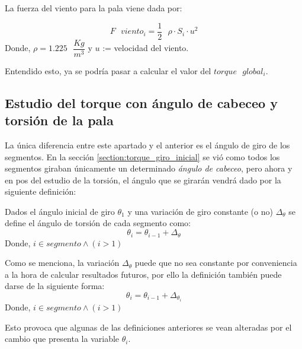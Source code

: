  
 \begin{definicion}
 La fuerza del viento para la pala viene dada por:
 
 $$ F \text{ } viento_i = \dfrac{1}{2} \text{ } \rho \cdot S_i \cdot u^2$$
Donde,
 \centering  $\rho = 1.225 \text{ } \dfrac{Kg}{m^3}$ y $u$ := velocidad del viento.
 \label{def:fuerza_viento_inicial}
 \end{definicion}
 
\vspace{15pt} Entendido esto, ya se podría pasar a calcular el valor del $torque \text{ } global_i$.
 
 
 
 
 
 
 
 
 
 
 
 
 \subsection{Estudio del torque con ángulo de cabeceo y torsión de la pala}
\label{section:torque_giro_torsion}

La única diferencia entre este apartado y el anterior es el ángulo de giro de los segmentos. En la sección \ref{section:torque_giro_inicial} se vió como todos los segmentos giraban únicamente un determinado \textit{ángulo de cabeceo}, pero ahora y en pos del estudio de la torsión, el ángulo que se girarán vendrá dado por la siguiente definición: 


\begin{definicion}
Dados el ángulo inicial de giro $\theta_1 $ y una variación de giro constante (o no) $\Delta_\theta$ se define el ángulo de torsión de cada segmento como:
$$\theta_i = \theta_{i-1} + \Delta_\theta$$ 
Donde,
\centering $i \in segmento \wedge (i > 1)$

\label{def:theta_cte}
\end{definicion}


\begin{definicion}
Como se menciona, la variación $\Delta_\theta$ puede que no sea constante por conveniencia a la hora de calcular resultados futuros, por ello la definición también puede darse de la siguiente forma:
$$\theta_i = \theta_{i-1} + \Delta_{\theta_{i}}$$ 
Donde,
\centering $i \in segmento \wedge (i > 1)$
\label{def:theta_nocte}
\end{definicion}


Esto provoca que algunas de las definiciones anteriores se vean alteradas por el cambio que presenta la variable $\theta_i$.\\

